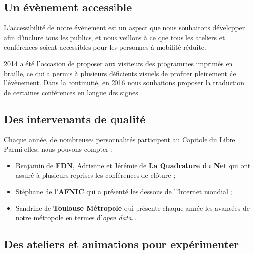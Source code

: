 \subsection{Un évènement accessible}

\begin{minipage}{0.4\textwidth}
\begin{center}
\end{center}
\end{minipage}
\begin{minipage}{0.6\textwidth}
L'accessibilité de notre évènement est un aspect que nous souhaitons
 développer afin d'inclure tous les publics, et nous veillons à ce que
 tous les ateliers et conférences soient accessibles pour les personnes
 à mobilité réduite.

2014 a été l'occasion de proposer aux visiteurs des programmes
 imprimés en braille, ce qui a permis à plusieurs déficients visuels
 de profiter pleinement de l'évènement. Dans la continuité, en 2016
 nous souhaitons proposer la traduction de certaines conférences en
 langue des signes.
\end{minipage}

\subsection{Des intervenants de qualité}

Chaque année, de nombreuses personnalités participent au Capitole du Libre. Parmi elles, nous pouvons compter :

\begin{itemize}[label=$\bullet$]
\item Benjamin  de \textbf{FDN}, Adrienne  et Jérémie  de \textbf{La Quadrature du Net} qui ont assuré à plusieurs reprises les conférences de clôture ;
\item Stéphane  de l'\textbf{AFNIC} qui a présenté les dessous de l'Internet mondial ;
\item Sandrine  de \textbf{Toulouse Métropole} qui présente chaque année les avancées de notre métropole en termes d'\textit{open data}\dots
\end{itemize} 

\subsection{Des ateliers et animations pour expérimenter}

